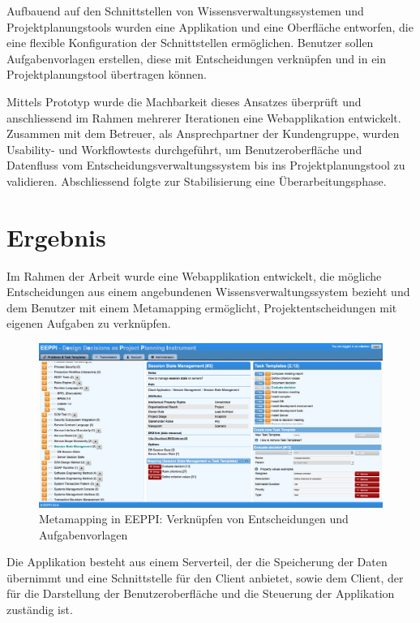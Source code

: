 	Aufbauend auf den Schnittstellen von Wissensverwaltungssystemen und Projektplanungstools wurden eine Applikation und eine Oberfläche entworfen, 
	die eine flexible Konfiguration der Schnittstellen ermöglichen. 
	Benutzer sollen Aufgabenvorlagen erstellen, diese mit Entscheidungen verknüpfen und in ein Projektplanungstool übertragen können. 

	Mittels Prototyp wurde die Machbarkeit dieses Ansatzes überprüft 
	und anschliessend im Rahmen mehrerer Iterationen eine Webapplikation entwickelt. 
	Zusammen mit dem Betreuer, als Ansprechpartner der Kundengruppe, wurden Usability- und Workflowtests durchgeführt, 
	um Benutzeroberfläche und Datenfluss vom Entscheidungsverwaltungssystem bis ins Projektplanungstool zu validieren. 
	Abschliessend folgte zur Stabilisierung eine Überarbeitungsphase.
	
	
	\section{Ergebnis}
		
	Im Rahmen der Arbeit wurde eine Webapplikation entwickelt, 
	die mögliche Entscheidungen aus einem angebundenen Wissensverwaltungssystem bezieht 
	und dem Benutzer mit einem Metamapping ermöglicht,
	Projektentscheidungen mit eigenen Aufgaben zu verknüpfen. 
	
	\begin{figure}[H]
		\includegraphics[width=\textwidth]{introduction/img/eeppiDecisionsAndTaskTemplates.png}
		\centering
		\caption{Metamapping in EEPPI: Verknüpfen von Entscheidungen und Aufgabenvorlagen}
		\label{fig:metamapping}
	\end{figure}	
	
	Die Applikation besteht aus einem Serverteil, der die Speicherung der Daten übernimmt und eine Schnittstelle für den Client anbietet, sowie dem Client, der für die Darstellung der Benutzeroberfläche und die Steuerung der Applikation zuständig ist.
	

